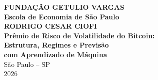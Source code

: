 
\begin{titlepage}
\begin{center}

\Large \textbf{FUNDAÇÃO GETULIO VARGAS}\\[0.3cm]
\large \textbf{Escola de Economia de São Paulo}\\[4.5cm]

\Large \textbf{RODRIGO CESAR CIOFI}\\[4.5cm]

\Large \textbf{Prêmio de Risco de Volatilidade do Bitcoin:\\
Estrutura, Regimes e Previsão\\
com Aprendizado de Máquina}\\[6cm]

\large São Paulo -- SP\\[0.2cm]
\large 2026

\end{center}
\end{titlepage}
